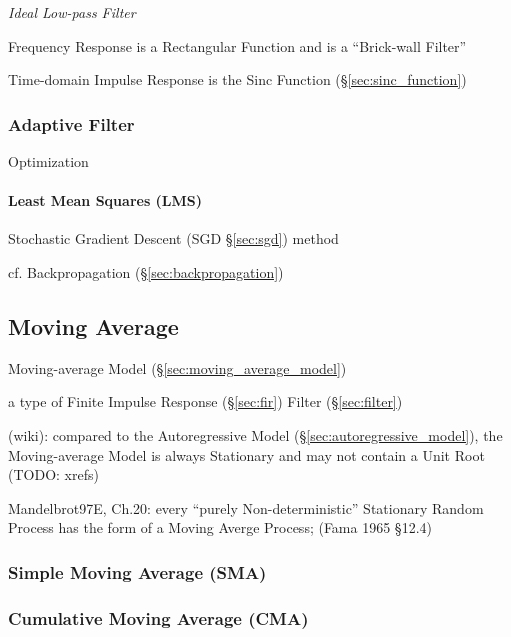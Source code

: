 \emph{Ideal Low-pass Filter}

Frequency Response is a Rectangular Function and is a ``Brick-wall Filter''

Time-domain Impulse Response is the Sinc Function (\S\ref{sec:sinc_function})



\subsubsection{Adaptive Filter}\label{sec:adaptive_filter}

Optimization



\paragraph{Least Mean Squares (LMS)}\label{sec:lms}\hfill

Stochastic Gradient Descent (SGD \S\ref{sec:sgd}) method

cf. Backpropagation (\S\ref{sec:backpropagation})



\subsection{Moving Average}\label{sec:moving_average}

Moving-average Model (\S\ref{sec:moving_average_model})

a type of Finite Impulse Response (\S\ref{sec:fir}) Filter (\S\ref{sec:filter})

(wiki): compared to the Autoregressive Model (\S\ref{sec:autoregressive_model}),
the Moving-average Model is always Stationary and may not contain a Unit Root
(TODO: xrefs)

Mandelbrot97E, Ch.20:
every ``purely Non-deterministic'' Stationary Random Process has the form of a
Moving Averge Process; (Fama 1965 \S 12.4)



\subsubsection{Simple Moving Average (SMA)}\label{sec:sma}

\subsubsection{Cumulative Moving Average (CMA)}\label{sec:cma}

